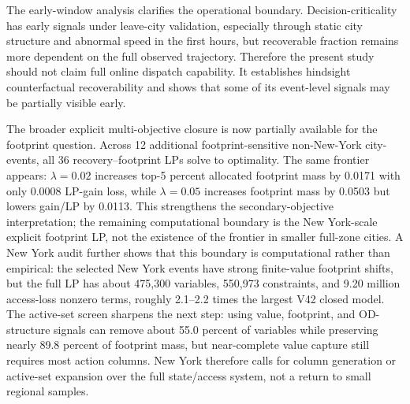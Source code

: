 The early-window analysis clarifies the operational boundary. Decision-criticality has early signals under leave-city validation, especially through static city structure and abnormal speed in the first hours, but recoverable fraction remains more dependent on the full observed trajectory. Therefore the present study should not claim full online dispatch capability. It establishes hindsight counterfactual recoverability and shows that some of its event-level signals may be partially visible early.

The broader explicit multi-objective closure is now partially available for the footprint question. Across 12 additional footprint-sensitive non-New-York city-events, all 36 recovery--footprint LPs solve to optimality. The same frontier appears: \(\lambda=0.02\) increases top-5 percent allocated footprint mass by 0.0171 with only 0.0008 LP-gain loss, while \(\lambda=0.05\) increases footprint mass by 0.0503 but lowers gain/LP by 0.0113. This strengthens the secondary-objective interpretation; the remaining computational boundary is the New York-scale explicit footprint LP, not the existence of the frontier in smaller full-zone cities. A New York audit further shows that this boundary is computational rather than empirical: the selected New York events have strong finite-value footprint shifts, but the full LP has about 475,300 variables, 550,973 constraints, and 9.20 million access-loss nonzero terms, roughly 2.1--2.2 times the largest V42 closed model. The active-set screen sharpens the next step: using value, footprint, and OD-structure signals can remove about 55.0 percent of variables while preserving nearly 89.8 percent of footprint mass, but near-complete value capture still requires most action columns. New York therefore calls for column generation or active-set expansion over the full state/access system, not a return to small regional samples.

